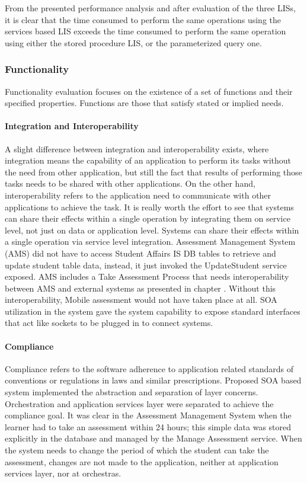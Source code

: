 \documentclass[12pt,a4paper,final,twoside,onecolumn,titlepage]{book}
\begin{document}
From the presented performance analysis and after evaluation of the three LISs, it is clear that the time consumed to perform the same operations using the services based LIS exceeds the time consumed to perform the same operation using either the stored procedure LIS, or the parameterized query one.

\subsubsection{Functionality}
Functionality evaluation focuses on the existence of a set of functions and their specified properties. Functions are those that satisfy stated or implied needs.


\paragraph{Integration and Interoperability}
A slight difference between integration and interoperability exists, where integration means the capability of an application to perform its tasks without the need from other application, but still the fact that results of performing those tasks needs to be shared with other applications. On the other hand, interoperability refers to the application need to communicate with other applications to achieve the task. It is really worth the effort to see that systems can share their effects within a single operation by integrating them on service level, not just on data or application level. Systems can share their effects within a single operation via service level integration. Assessment Management System (AMS) did not have to access Student Affairs \gls{IS} \gls{DB} tables to retrieve and update student table data, instead, it just invoked the UpdateStudent service exposed. AMS includes a Take Assessment Process that needs interoperability between AMS and external systems as presented in chapter \cite{EV10}. Without this interoperability, Mobile assessment would not have taken place at all. \gls{SOA} utilization in the system gave the system capability to expose standard interfaces that act like sockets to be plugged in to connect systems.

\paragraph{Compliance}
Compliance refers to the software adherence to application related standards of conventions or regulations in laws and similar prescriptions. Proposed SOA based system implemented the abstraction and separation of layer concerns. Orchestration and application services layer were separated to achieve the compliance goal. It was clear in the Assessment Management System when the learner had to take an assessment within 24 hours; this simple data was stored explicitly in the database and managed by the Manage Assessment service. When the system needs to change the period of which the student can take the assessment, changes are not made to the application, neither at application services layer, nor at orchestras.
\end{document}
